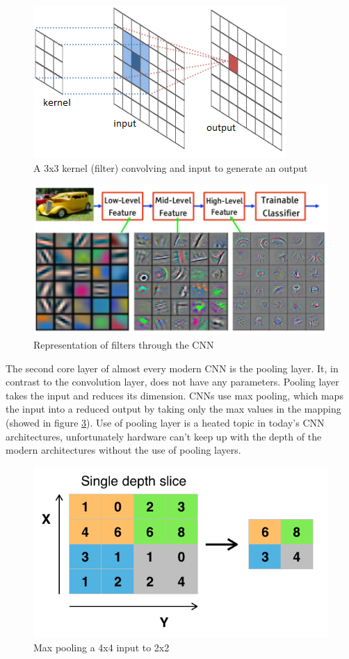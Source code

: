 \documentclass[times, utf8, diplomski]{fer}
\begin{document}
\begin{figure}
  \includegraphics{figures/conv1.png}
  \centering
  \caption{A 3x3 kernel (filter) convolving and input to generate an output}
  \label{fig:conv1}
\end{figure}

\begin{figure}
  \includegraphics[scale=1.4]{figures/filter.png}
  \centering
  \caption{Representation of filters through the CNN}
  \label{fig:filter}
\end{figure}

The second core layer of almost every modern CNN is the pooling layer. It, in contrast to the convolution layer, does not have any parameters. Pooling layer takes the input and reduces its dimension. CNNs use max pooling, which maps the input into a reduced output by taking only the max values in the mapping (showed in figure \ref{fig:pool}). Use of pooling layer is a heated topic in today's CNN architectures, unfortunately hardware can't keep up with the depth of the modern architectures without the use of pooling layers.

\begin{figure}
  \includegraphics[scale=0.6]{figures/pool.png}
  \centering
  \caption{Max pooling a 4x4 input to 2x2}
  \label{fig:pool}
\end{figure}
\end{document}

